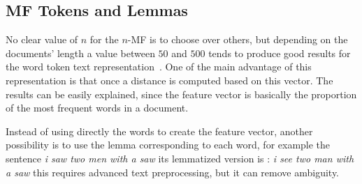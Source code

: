 \subsection{MF Tokens and Lemmas}

No clear value of $n$ for the $n$-MF is to choose over others, but depending on the documents' length a value between $50$ and $500$ tends to produce good results for the word token text representation~\cite{savoy_text_representation}.
One of the main advantage of this representation is that once a distance is computed based on this vector.
The results can be easily explained, since the feature vector is basically the proportion of the most frequent words in a document.

Instead of using directly the words to create the feature vector, another possibility is to use the lemma corresponding to each word, for example the sentence \textit{i saw two men with a saw} its lemmatized version is : \textit{i see two man with a saw} this requires advanced text preprocessing, but it can remove ambiguity.
